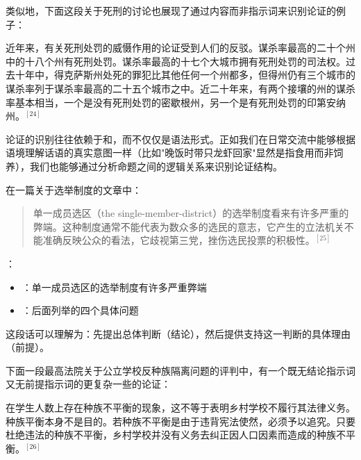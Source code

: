 类似地，下面这段关于死刑的讨论也展现了通过内容而非指示词来识别论证的例子：

\begin{displayquote}
近年来，有关死刑处罚的威慑作用的论证受到人们的反驳。谋杀率最高的二十个州中的十八个州有死刑处罚。谋杀率最高的十七个大城市拥有死刑处罚的司法权。过去十年中，得克萨斯州处死的罪犯比其他任何一个州都多，但得州仍有三个城市的谋杀率列于谋杀率最高的二十五个城市之中。近二十年来，有两个接壤的州的谋杀率基本相当，一个是没有死刑处罚的密歇根州，另一个是有死刑处罚的印第安纳州。${}^{[24]}$
\end{displayquote}

\begin{theorembox}[title=语境识别的重要性]
论证的识别往往依赖于和，而不仅仅是语法形式。正如我们在日常交流中能够根据语境理解话语的真实意图一样（比如"晚饭时带只龙虾回家"显然是指食用而非饲养），我们也能够通过分析命题之间的逻辑关系来识别论证结构。
\end{theorembox}

\begin{examplebox}[title=通过语境识别论证]
在一篇关于选举制度的文章中：
\begin{quotation}
单一成员选区（the single-member-district）的选举制度看来有许多严重的弊端。这种制度通常不能代表为数众多的选民的意志，它产生的立法机关不能准确反映公众的看法，它歧视第三党，挫伤选民投票的积极性。${}^{[25]}$
\end{quotation}

：
\begin{itemize}
  \item {}：单一成员选区的选举制度有许多严重弊端
  \item {}：后面列举的四个具体问题
\end{itemize}

这段话可以理解为：先提出总体判断（结论），然后提供支持这一判断的具体理由（前提）。
\end{examplebox}

下面一段最高法院关于公立学校反种族隔离问题的评判中，有一个既无结论指示词又无前提指示词的更复杂一些的论证：

\begin{displayquote}
在学生人数上存在种族不平衡的现象，这不等于表明乡村学校不履行其法律义务。种族平衡本身不是目的。若种族不平衡是由于违背宪法使然，必须予以追究。只要杜绝违法的种族不平衡，乡村学校并没有义务去纠正因人口因素而造成的种族不平衡。${}^{[26]}$
\end{displayquote}

